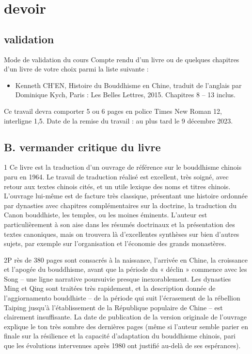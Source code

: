 \chapter{devoir}

\cite{chen_histoire_2015}

\cite{chen_economic_1956}

\section{validation}
Mode de validation du cours   Compte rendu d’un livre ou de quelques chapitres d’un livre de votre choix parmi la liste suivante :  
\begin{itemize}
 
\item  Kenneth CH’EN, Histoire du Bouddhisme en Chine, traduit de l’anglais par Dominique Kych, Paris : Les Belles Lettres, 2015. Chapitres 8 – 13 inclus.   

\end{itemize}

Ce travail devra comporter 5 ou 6 pages en police Times New Roman 12, interligne 1,5.   Date de la remise du travail : au plus tard le 9 décembre 2023. 



 

\section{B. vermander critique du livre}
\cite{vermander_kenneth_2016}
 

1 Ce livre est la traduction d’un ouvrage de référence sur le bouddhisme chinois paru en 1964. Le travail de traduction réalisé est excellent, très soigné, avec retour aux textes chinois cités, et un utile lexique des noms et titres chinois. L’ouvrage lui-même est de facture très classique, présentant une histoire ordonnée par dynasties avec chapitres complémentaires sur la doctrine, la traduction du Canon bouddhiste, les temples, ou les moines éminents. L’auteur est particulièrement à son aise dans les résumés doctrinaux et la présentation des textes canoniques, mais on trouvera là d’excellentes synthèses sur bien d’autres sujets, par exemple sur l’organisation et l’économie des grands monastères.

2P rès de 380 pages sont consacrés à la naissance, l’arrivée en Chine, la croissance et l’apogée du bouddhisme, avant que la période du « déclin » commence avec les Song – une ligne narrative poursuivie presque inexorablement. Les dynasties Ming et Qing sont traitées très rapidement, et la description donnée de l’aggiornamento bouddhiste – de la période qui suit l’écrasement de la rébellion Taiping jusqu’à l’établissement de la République populaire de Chine – est clairement insuffisante. La date de publication de la version originale de l’ouvrage explique le ton très sombre des dernières pages (même si l’auteur semble parier en finale sur la résilience et la capacité d’adaptation du bouddhisme chinois, pari que les évolutions intervenues après 1980 ont justifié au-delà de ses espérances).

